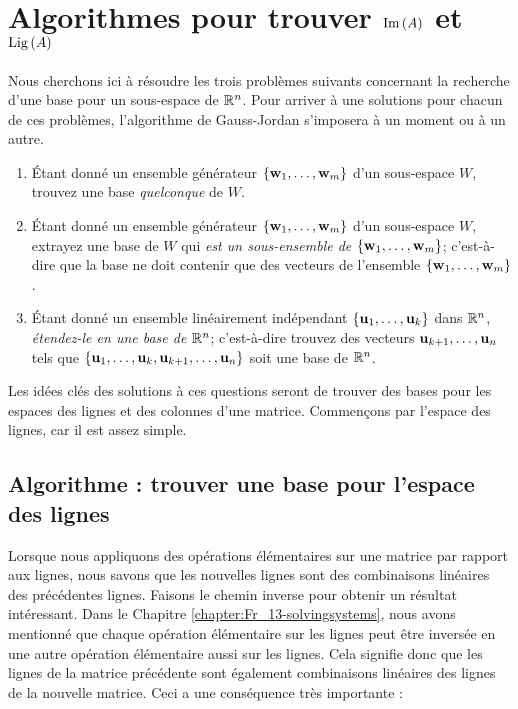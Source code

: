 \chapter{Algorithmes pour trouver $\operatorname{Im}\,(A)$ et $\operatorname{Lig\,}(A)$}\label{chapter:Fr_18-basiscolnew}

Nous cherchons ici à résoudre les trois probl\`emes suivants concernant la recherche d'une base pour un sous-espace de $\mathbb{R}^n$. Pour arriver à une solutions pour chacun de ces problèmes, l'algorithme de Gauss-Jordan s'imposera à un moment ou à un autre.

\begin{enumerate}[(1)]\label{FindingBases} 
\item Étant donné un ensemble g\'en\'erateur $\{\mathbf{w}_1, \dots ,\mathbf{w}_m\}$ d'un sous-espace $W$, trouvez une base {\it quelconque} de $W$.
\medskip
\item Étant donné un ensemble g\'en\'erateur $\{\mathbf{w}_1, \dots ,\mathbf{w}_m\}$ d'un sous-espace $W$, extrayez une base de $W$ qui {\it est un sous-ensemble de} $\{\mathbf{w}_1, \dots ,\mathbf{w}_m\}$; c'est-à-dire que la base ne doit contenir que des vecteurs de l'ensemble $\{\mathbf{w}_1, \dots ,\mathbf{w}_m\}$.
\medskip
\item Étant donné un ensemble linéairement indépendant $\{\mathbf{u}_1, \dots ,\mathbf{u}_k\}$ dans $\mathbb{R}^n$, {\it étendez-le en une base de $\mathbb{R}^n$}; c'est-à-dire trouvez des vecteurs $\mathbf{u}_{k+1}, \dots, \mathbf{u}_n$ tels que $\{\mathbf{u}_1, \dots ,\mathbf{u}_k,\mathbf{u}_{k+1}, \dots, \mathbf{u}_n \}$ soit une base de $\mathbb{R}^n$.
\end{enumerate}

Les idées clés des solutions à ces questions seront de trouver des bases pour les espaces des lignes et des colonnes d'une matrice. Commençons par l'espace des lignes, car il est assez simple.

\section{Algorithme : trouver une base pour l'espace des lignes}

Lorsque nous appliquons des opérations élémentaires sur une matrice par rapport aux lignes, nous savons que les nouvelles lignes sont des combinaisons linéaires des pr\'ec\'edentes lignes. Faisons le chemin inverse pour obtenir un résultat intéressant. Dans le Chapitre \ref{chapter:Fr_13-solvingsystems}, nous avons mentionné que chaque opération élémentaire sur les lignes peut être inversée en une autre opération élémentaire aussi sur les lignes. Cela signifie donc que les lignes de la matrice pr\'ec\'edente sont également combinaisons linéaires des lignes de la nouvelle matrice. Ceci a une conséquence très importante :



